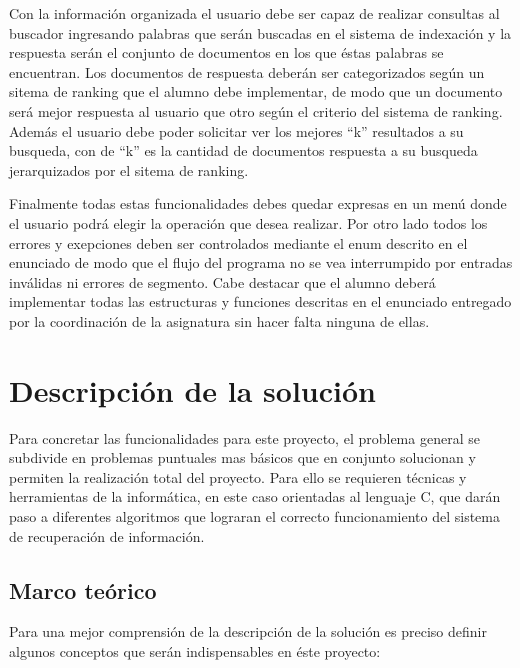 \documentclass[letterpaper,12pt]{report}
\begin{document}
Con la información organizada el usuario debe ser capaz de realizar consultas al buscador ingresando palabras que serán buscadas en el sistema de indexación y la respuesta serán el conjunto de documentos en los que éstas palabras se encuentran. Los documentos de respuesta deberán ser categorizados según un sitema de ranking que el alumno debe implementar, de modo que un documento será mejor respuesta al usuario que otro según el criterio del sistema de ranking. Además el usuario debe poder solicitar ver los mejores ``k'' resultados a su busqueda, con de ``k'' es la cantidad de documentos respuesta a su busqueda jerarquizados por el sitema de ranking.

Finalmente todas estas funcionalidades debes quedar expresas en un menú donde el usuario podrá elegir la operación que desea realizar. Por otro lado todos los errores y exepciones deben ser controlados mediante el enum descrito en el enunciado de modo que el flujo del programa no se vea interrumpido por entradas inválidas ni errores de segmento. Cabe destacar que el alumno deberá implementar todas las estructuras y funciones descritas en el enunciado entregado por la coordinación de la asignatura sin hacer falta ninguna de ellas.

\chapter{Descripci\'on de la soluci\'on}

Para concretar las funcionalidades para este proyecto, el problema general se subdivide en problemas puntuales mas básicos que en conjunto solucionan y permiten la realización total del proyecto. Para ello se requieren técnicas y herramientas de la informática, en este caso orientadas al lenguaje C, que darán paso a diferentes algoritmos que lograran el correcto funcionamiento del sistema de recuperación de información.

\section {Marco te\'orico}

Para una mejor comprensión de la descripción de la solución es preciso definir algunos conceptos que
serán indispensables en éste proyecto:
\end{document}
